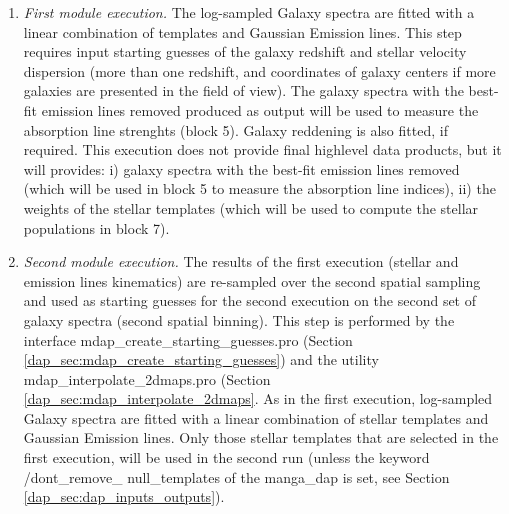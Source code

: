 \documentclass[11pt]{book}
\begin{document}
\begin{enumerate}

\item {\it First module execution.} The log-sampled Galaxy spectra are
  fitted with a linear combination of templates and Gaussian Emission
  lines. This step requires input starting guesses of the galaxy
  redshift and stellar velocity dispersion (more than one redshift,
  and coordinates of galaxy centers if more galaxies are presented in
  the field of view). The galaxy spectra with the best-fit emission
  lines removed produced as output will be used to measure the
  absorption line strenghts (block 5).  Galaxy reddening is also
  fitted, if required. This execution does not provide final highlevel
  data products, but it will provides: i) galaxy spectra with the
  best-fit emission lines removed (which will be used in block 5 to
  measure the absorption line indices), ii) the weights of the stellar
  templates (which will be used to compute the stellar populations in
  block 7).

\item {\it Second module execution.} The results of the first
  execution (stellar and emission lines kinematics) are re-sampled
  over the second spatial sampling and used as starting guesses for
  the second execution on the second set of galaxy spectra (second
  spatial binning). This step is performed by the interface
  mdap\_create\_starting\_guesses.pro (Section
  \ref{dap_sec:mdap_create_starting_guesses}) and the utility
  mdap\_interpolate\_2dmaps.pro (Section
  \ref{dap_sec:mdap_interpolate_2dmaps}. As in the first execution,
  log-sampled Galaxy spectra are fitted with a linear combination of
  stellar templates and Gaussian Emission lines. Only those stellar
  templates that are selected in the first execution, will be used in
  the second run (unless the keyword /dont\_remove\_ null\_templates
  of the manga\_dap is set, see Section
  \ref{dap_sec:dap_inputs_outputs}).



\end{enumerate}
\end{document}
